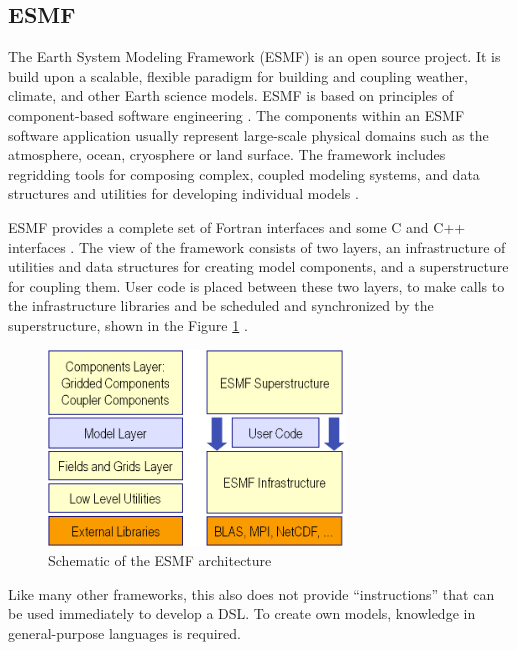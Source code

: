 \subsection{ESMF}
\par
The Earth System Modeling Framework (ESMF) is an open source project. It is build upon a scalable, flexible paradigm for building and coupling weather, climate, and other Earth science models. ESMF is based on principles of component-based software engineering \autocite{dsl:esmf-homepage}. The components within an ESMF software application usually represent large-scale physical domains such as the atmosphere, ocean, cryosphere or land surface. The framework includes regridding tools for composing complex, coupled modeling systems, and data structures and utilities for developing individual models \autocite{dsl:esmf-free_lib}.
\par
ESMF provides a complete set of Fortran interfaces and some C and C++ interfaces \autocite{dsl:esmf-tutorial1}. The view of the framework consists of two layers, an infrastructure of utilities and data structures for creating model components, and a superstructure for coupling them. User code is placed between these two layers, to make calls to the infrastructure libraries and be scheduled and synchronized by the superstructure, shown in the Figure \ref{fig:esmf_architecture} \autocite{dsl:esmf-overview}.
\begin{figure}[h]
	\centering
	\includegraphics[width=0.7\textwidth]{pics/esmf/esmf_architecture.png}
	\caption[Schematic of the ESMF architecture]{Schematic of the ESMF architecture \autocite{dsl:esmf-regridding} \label{fig:esmf_architecture}}	
\end{figure}
\par
Like many other frameworks, this also does not provide “instructions” that can be used immediately to develop a DSL. To create own models, knowledge in general-purpose languages is required.

